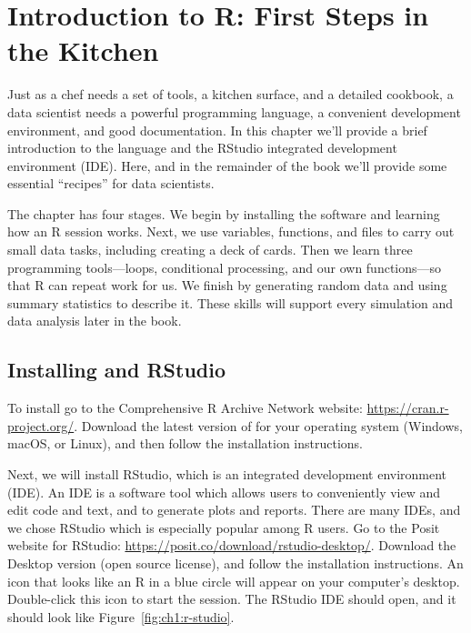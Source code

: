 \chapter{Introduction to R: First Steps in the Kitchen}\label{ch:rintro}
Just as a chef needs a set of tools, a kitchen surface, and a detailed cookbook,
a data scientist needs a powerful programming language, a convenient 
development environment, and good documentation.
In this chapter we'll provide a brief introduction to the \R language and the 
RStudio integrated development environment (IDE). Here, and in the remainder 
of the book we'll provide some essential ``recipes'' for data scientists.


 
The chapter has four stages. We begin by installing the software and learning
how an R session works. Next, we use variables, functions, and files to carry
out small data tasks, including creating a deck of cards. Then we learn three
programming tools---loops, conditional processing, and our own functions---so
that R can repeat work for us. We finish by generating random data and using
summary statistics to describe it. These skills will support every simulation
and data analysis later in the book.
\section{Installing \R and RStudio}\label{installing-r-and-RStudio}
To install \R go to the Comprehensive R Archive Network  website: 
\url{https://cran.r-project.org/}.  Download the latest version of \R for
 your operating system (Windows, macOS, or Linux), and then   
follow the installation instructions.


Next, we will install RStudio, which is an integrated development environment (IDE).
An IDE is a software tool which allows users to conveniently view and edit code and text,
and to generate plots and reports. There are many IDEs, and we chose RStudio
which is especially popular among R users.
Go to the Posit website for RStudio:
\url{https://posit.co/download/rstudio-desktop/}. Download the Desktop version
(open source license), and %
follow the installation instructions.  An icon that looks like an R in a
blue circle will appear on your computer's desktop. Double-click this icon to
start the \R session. The RStudio IDE should open, and it should look like
Figure~\ref{fig:ch1:r-studio}.

